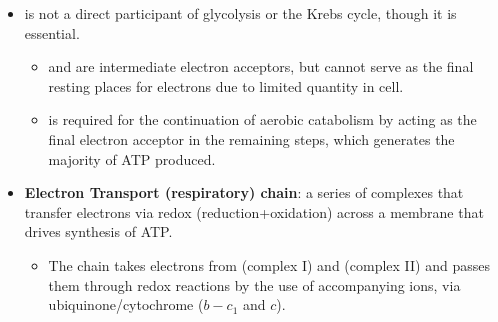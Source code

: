 \documentclass[12pt,a4paper]{article}
\begin{document}
\begin{itemize}
\begin{itemize}
\begin{itemize}
                \item Each pyruvate is {\color{o-Sun}oxidatively decarboxylated}, forming {\color{o-Sun}} and a two-carbon acetyl group that is combned with coenzyme A to form {\color{o-Sun}acetyl coenzyme A (acetyl-CoA)}.
                \item Acetyl-CoA is the starting point for the citric acid cycle; can be obtained from oxidation of fatty acids too.
                \item Overall outcomes:
                    \begin{itemize}
                        \item 6 carbons of each glucose molecule catabolized emerge in the form of 6 molecules of  as the pyruvate molecules are processed.
                        \item 8 molecules of  and 2 molecules of  are produced for each glucose molecule. (4/1 per pyruvate)
                        \item  2 molecules of ATP are produced for each glucose catabolized. 
                        \item {}\SI{2820}{kJ\per\mole}.
                    \end{itemize}
            \end{itemize}
        \item {} is not a direct participant of glycolysis or the Krebs cycle, though it is essential.
            \begin{itemize}
                \item {\color{o-Sun} and } are {\color{o-Sun}intermediate} electron acceptors, but cannot serve as the final resting places for electrons due to limited quantity in cell.
                \item {\color{o-Sun}} is required for the continuation of aerobic catabolism by acting as the {\color{o-Sun}final electron acceptor} in the remaining steps, which generates the majority of ATP produced.
            \end{itemize}
        \item \textbf{Electron Transport (respiratory) chain}: a series of complexes that transfer electrons via redox (reduction+oxidation) across a membrane that drives synthesis of ATP.
            \begin{itemize}
                \item The chain takes electrons from  (complex I) and  (complex II) and passes them through redox reactions by the use of accompanying {\color{pos}} ions, via ubiquinone/cytochrome (\(b-c_1\) and \(c\)).

\end{itemize}
\end{itemize}
\end{itemize}
\end{document}
